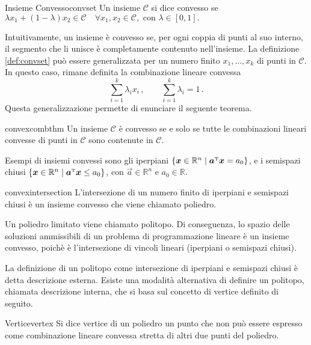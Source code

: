 \begin{defbox}{Insieme Convesso}{convset}
    Un insieme \( \mathcal{C} \) si dice convesso se
    \(
        \lambda x_1 + (1 - \lambda) x_2 \in \mathcal{C} \quad \forall x_1, x_2 \in \mathcal{C}, \text{ con } \lambda
        \in [0, 1].
    \)
\end{defbox}
Intuitivamente, un insieme è convesso se, per ogni coppia di punti al suo interno, il segmento che li unisce è
completamente contenuto nell’insieme. La definizione \ref{def:convset} può essere generalizzata per un numero finito \(
x_1, \ldots, x_k \) di punti in \( \mathcal{C} \). In questo caso, rimane definita la combinazione lineare
convessa
\begin{equation}
    \sum_{i=1}^k \lambda_i x_i\,, \qquad\sum_{i=1}^k \lambda_i = 1\,.
\end{equation}
Questa generalizzazione permette di enunciare il seguente teorema.
\begin{thmbox}{}{convexcombthm}
    Un insieme \( \mathcal{C} \) è convesso se e solo se tutte le combinazioni lineari convesse di punti in \(
    \mathcal{C} \) sono contenute in \( \mathcal{C} \).
\end{thmbox}
Esempi di insiemi convessi sono gli iperpiani \( \{\bm{x} \in \mathbb{R}^n \mid \bm{a}^{\scriptscriptstyle\mathrm{T}} \bm{x} = a_0\} \), e i
semispazi chiusi \( \{\bm{x} \in \mathbb{R}^n \mid \bm{a}^{\scriptscriptstyle\mathrm{T}} \bm{x} \leq a_0\} \), con \( \vec{a} \in \mathbb{R}^n
\) e \( a_0 \in \mathbb{R} \).
\begin{thmbox}{}{convexintersection}
    L'intersezione di un numero finito di iperpiani e semispazi chiusi è un insieme convesso che viene chiamato poliedro.
\end{thmbox}
Un poliedro limitato viene chiamato politopo. Di conseguenza, lo spazio delle soluzioni ammissibili di un problema di
programmazione lineare è un insieme convesso, poichè è l'intersezione di vincoli lineari (iperpiani o semispazi chiusi).

La definizione di un politopo come intersezione di iperpiani e semispazi chiusi è detta descrizione esterna. Esiste una
modalità alternativa di definire un politopo, chiamata descrizione interna, che si basa sul concetto di vertice definito
di seguito.

\begin{defbox}{Vertice}{vertex}
   Si dice vertice di un poliedro un punto che non può essere espresso come combinazione lineare convessa stretta di
   altri due punti del poliedro.
\end{defbox}

